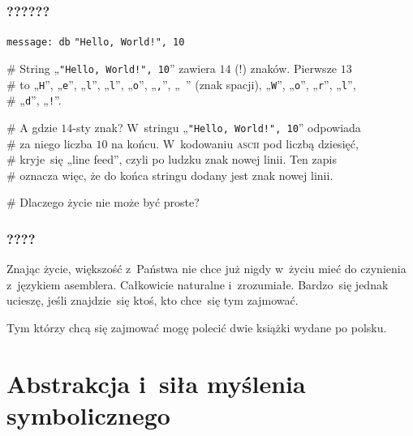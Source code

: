 \documentclass[10pt,t]{beamer}
\begin{document}
\begin{frame}
  \frametitle{??????}


  \texttt{message: db} \hphantom{aaaaa} \texttt{"Hello, World!", 10}

  \# String „\texttt{"Hello, World!", 10}” zawiera $14$ (!) znaków.
  Pierwsze $13$ \\
  \# to „\texttt{H}”, „\texttt{e}”, „\texttt{l}”, „\texttt{l}”,
  „\texttt{o}”, „\texttt{,}”, „\texttt{ }” (znak spacji), „\texttt{W}”,
  „\texttt{o}”, „\texttt{r}”, „\texttt{l}”, \\
  \# „\texttt{d}”, „\texttt{!}”.

  \# A gdzie $14$-sty znak? W~stringu „\texttt{"Hello, World!", 10}”
  odpowiada \\
  \# za niego liczba $10$ na końcu. W~kodowaniu \textsc{ascii} pod liczbą
  dziesięć, \\
  \# kryje~się „line feed”, czyli po ludzku znak nowej linii. Ten zapis \\
  \# oznacza więc, że do końca stringu dodany jest znak nowej linii.

  \# Dlaczego życie nie może być proste?

\end{frame}





\begin{frame}
  \frametitle{????}


  Znając życie, większość z~Państwa nie chce już nigdy w~życiu mieć
  do czynienia z~językiem asemblera. Całkowicie naturalne i~zrozumiałe.
  Bardzo~się jednak ucieszę, jeśli znajdzie~się ktoś, kto chce~się
  tym zajmować.

  Tym którzy chcą się zajmować mogę polecić dwie książki wydane po polsku.

\end{frame}










\section{Abstrakcja i~siła myślenia symbolicznego}
\end{document}
